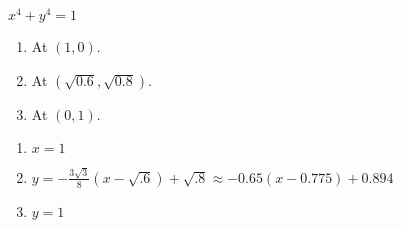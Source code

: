 {$x^{4}+y^{4} = 1$
\begin{enumerate}
\item	At $(1,0)$.
\item	At $(\sqrt{0.6},\sqrt{0.8})$.
\item	At $(0,1)$.
\end{enumerate}
}
{\begin{enumerate}
\item	$x=1$
\item	$y = -\frac{3\sqrt{3}}{8}(x-\sqrt{.6})+\sqrt{.8} \approx -0.65(x-0.775)+0.894$
\item	$y=1$
\end{enumerate}
}
